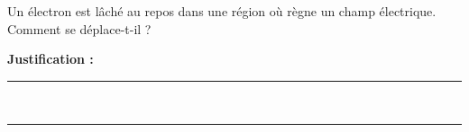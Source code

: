 Un électron est lâché au repos dans une région où règne un champ électrique. Comment se déplace-t-il ?

\choices

\noindent\textbf{Justification :} \hrulefill \\[2.5ex]
\rule{\linewidth}{0.4pt} \\[2.5ex]
\rule{\linewidth}{0.4pt}
\vfill
